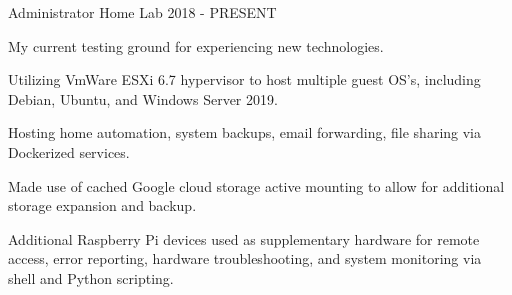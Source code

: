 

\begin{cventries}

  \cventry
    {Administrator} %
    {Home Lab} %
    {} %
    {2018 - PRESENT} %
    {
      \begin{cvitems}
        \item {My current testing ground for experiencing new technologies.}
        \item {Utilizing VmWare ESXi 6.7 hypervisor to host multiple guest OS's, including Debian, Ubuntu, and Windows Server 2019.}
        \item {Hosting home automation, system backups, email forwarding, file sharing via Dockerized services.}
        \item {Made use of cached Google cloud storage active mounting to allow for additional storage expansion and backup.}
        \item {Additional Raspberry Pi devices used as supplementary hardware for remote access, error reporting, hardware troubleshooting, and system monitoring via shell and Python scripting.}
      \end{cvitems}
    }
    
\end{cventries}

